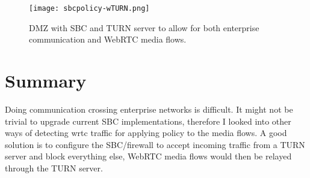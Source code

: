 \begin{figure}[here]
\centerline{\texttt{[image: sbcpolicy-wTURN.png]}}
\caption{DMZ with SBC and TURN server to allow for both enterprise communication and WebRTC media flows.}
\label{fig:sbc-turn}
\end{figure}

\newpage
\section{Summary}
Doing communication crossing enterprise networks is difficult. It might not be trivial to upgrade current SBC implementations, therefore I looked into other ways of detecting \gls{wrtc} traffic for applying policy to the media flows. A good solution is to configure the SBC/firewall to accept incoming traffic from a TURN server and block everything else, WebRTC media flows would then be relayed through the TURN server.